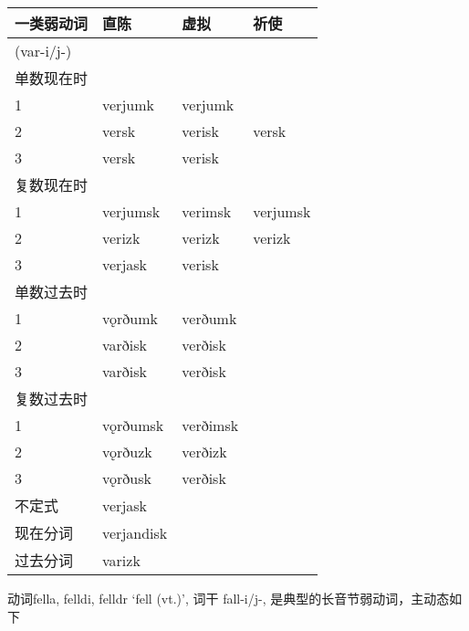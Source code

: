 \begin{longtable}{llll}
  \toprule
  一类弱动词 & 直陈       & 虚拟     & 祈使     \\
  \midrule
  \endhead
  \bottomrule
  \endfoot
  (var-i/j-) &            &          &          \\
  单数现在时 &            &          &          \\
  1          & verjumk    & verjumk  &          \\
  2          & versk      & verisk   & versk    \\
  3          & versk      & verisk   &          \\
  复数现在时 &            &          &          \\
  1          & verjumsk   & verimsk  & verjumsk \\
  2          & verizk     & verizk   & verizk   \\
  3          & verjask    & verisk   &          \\
  单数过去时 &            &          &          \\
  1          & vǫrðumk    & verðumk  &          \\
  2          & varðisk    & verðisk  &          \\
  3          & varðisk    & verðisk  &          \\
  复数过去时 &            &          &          \\
  1          & vǫrðumsk   & verðimsk &          \\
  2          & vǫrðuzk    & verðizk  &          \\
  3          & vǫrðusk    & verðisk  &          \\
  不定式     & verjask    &          &          \\
  现在分词   & verjandisk &          &          \\
  过去分词   & varizk     &          &          \\
\end{longtable}

动词fella, felldi, felldr `fell (vt.)‌', 词干 fall-i/j-,
是典型的长音节弱动词，主动态如下

